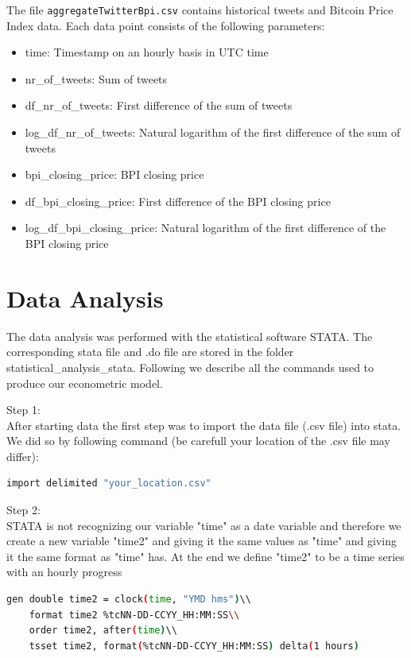 \documentclass[a4paper,12pt]{article}
\begin{document}
\begin{spacing}{1.2}
The file \verb|aggregateTwitterBpi.csv| contains historical tweets and Bitcoin Price Index data. Each data point consists of the following parameters:
\begin{itemize}
    \item time: Timestamp on an hourly basis in UTC time
    \item {nr\_of\_tweets}: Sum of tweets
    \item {df\_nr\_of\_tweets}: First difference of the sum of tweets
    \item {log\_df\_nr\_of\_tweets}: Natural logarithm of the first difference of the sum of tweets
    \item {bpi\_closing\_price}: BPI closing price
    \item {df\_bpi\_closing\_price}: First difference of the BPI closing price
    \item {log\_df\_bpi\_closing\_price}: Natural logarithm of the first difference of the BPI closing price
\end{itemize}

\section{Data Analysis}
The data analysis was performed with the statistical software STATA. The corresponding stata file and .do file are stored in the folder statistical\_analysis\_stata. Following we describe all the commands used to produce our econometric model.

\smallskip Step 1:\\
After starting data the first step was to import the data file (.csv file) into stata. We did so by following command (be carefull your location of the .csv file may differ):\\
	\begin{lstlisting}[language=bash]
    import delimited "your_location.csv"
	\end{lstlisting}

\smallskip Step 2:\\
STATA is not recognizing our variable "time" as a date variable and therefore we create a new variable "time2" and giving it the same values as "time" and giving it the same format as "time" has. At the end we define "time2" to be a time series with an hourly progress\\
	\begin{lstlisting}[language=bash]
    gen double time2 = clock(time, "YMD hms")\\
	format time2 %tcNN-DD-CCYY_HH:MM:SS\\
	order time2, after(time)\\
	tsset time2, format(%tcNN-DD-CCYY_HH:MM:SS) delta(1 hours)
	\end{lstlisting}


\end{spacing}
\end{document}
